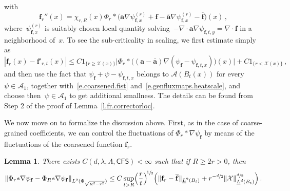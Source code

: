 \documentclass[11pt]{article} %
\numberwithin{equation}{section}
\newtheorem{lemma}[theorem]{Lemma}
\theoremstyle{definition}
\let\originalleft\left
\let\originalright\right
\renewcommand{\left}{\mathopen{}\mathclose\bgroup\originalleft}
\renewcommand{\right}{\aftergroup\egroup\originalright}
\newcommand{\f}{\mathbf{f}}
\renewcommand{\a}{\mathbf{a}}
\newcommand{\ahom}{\bar{\a}}
\newcommand{\X}{\mathcal{X}}
\newcommand{\indc}{1}
\newcommand{\minscale}{\chi}
\newcommand{\CFS}{\mathsf{CFS}}
\newcommand{\A}{\mathcal{A}}
\begin{document}
with 
\begin{equation*}  
\f_r''(x) = \minscale_{r,R}(x) \Phi_r \ast  \bigl( \a \nabla \psi_{\f,x}^{(r)}  + \f - \ahom \nabla \psi_{\f,x}^{(r)} - \overline{\f}  \bigr) (x)  \,,
\end{equation*}
where~$\psi_{\f,x}^{(r)}$ is suitably chosen local quantity solving~$-\nabla \cdot \a \nabla \psi_{\f,t,y} = \nabla \cdot \f$ in a neighborhood of~$x$. To see the sub-criticality in scaling, we first estimate simply as
\begin{equation} \label{e.fvsfloc.pre}
| \f_r(x) - \f'_{r,t}(x) | 
\leq  
C \indc_{\{r \geq \X(x)\}} \Big| \Phi_r \ast  \bigl(  (\a - \ahom) \nabla(\psi_{\f} -  \psi_{\f,t,x}) \bigr)(x) \Big| 
+ 
C  \indc_{\{r < \X(x)\}}
\,,
\end{equation}
and then use the fact that $\psi_{\f} + \psi - \psi_{\f,t,x} $ belongs to $\A(B_t(x))$ for every $\psi \in \A_1$, together with~\eqref{e.coarsened.fist} and~\eqref{e.genfluxmaps.heatscale}, and choose then~$\psi \in \A_1$ to get additional smallness. The details can be found from Step 2 of the proof of Lemma~\ref{l.fr.correctorloc}. 


\smallskip

We now move on to formalize the discussion above. First, as in the case of coarse-grained coefficients, we can control the fluctuations of $\Phi_r \ast \nabla \psi_\f$ by means of the fluctuations of the coarsened function $\f_r$. 


\begin{lemma} \label{l.fr.frtopsi}
There exists $C(d,\lambda,\Lambda,\CFS)<\infty$ such that if $R \geq 2r > 0$, then 
\begin{equation}  \label{e.fr.frtopsi}
\left\| \Phi_r {\ast}  \nabla \psi_\f  - \Phi_R {\ast} \nabla \psi_\f  \right\|_{L^2 ( \Phi_{\sqrt{R^2-r^2}})}
\leq 
C \sup_{t>R} \Bigl( \frac{r}{t} \Bigr)^{\!\sfrac12}  \Bigl( \| \f_r - \overline{\f} \|_{\underline{L}^2 \left( B_{t} \right)} 
+ 
 r^{-\sfrac d2}  \| \X \|_{\underline{L}^d \left( B_{t} \right)}^{\sfrac d2} \Bigr)
\,.
\end{equation}
\end{lemma}
\end{document}
